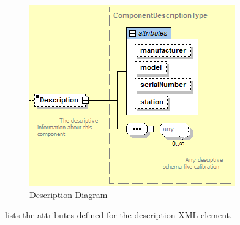 \documentclass{mtconnect}	%
\begin{document}
\begin{figure}[ht]
  \centering
  \includegraphics[width=.75\textwidth]{figures/description-schema-diagram.png}
  \caption{Description Diagram}
  \label{fig:description-schema-diagram}
\end{figure}

\FloatBarrier

 lists the attributes defined for the \gls{description} XML element.
\end{document}
